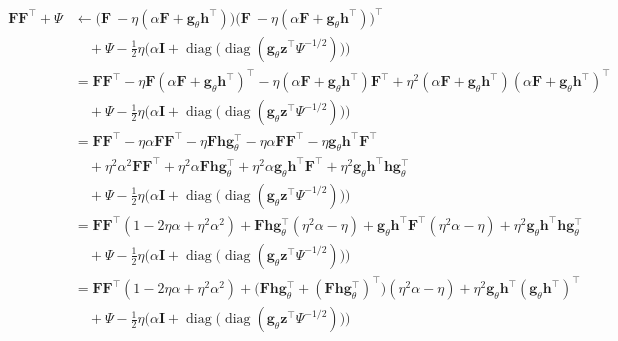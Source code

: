 \documentclass[msc,deptreport.inf]{infthesis} %
\newcommand{\matr}[1]{\mathbf{#1}}
\newcommand{\diag}{\mathop{\mathrm{diag}}}
\begin{document}
\begin{align}
\begin{split}
	\matr{F}\matr{F}^\intercal + \Psi
	& \leftarrow \big(\matr{F}\ - \eta (\alpha \matr{F} + \matr{g}_\theta \matr{h}^\intercal)\big) \big(\matr{F}\ - \eta (\alpha \matr{F} + \matr{g}_\theta \matr{h}^\intercal)\big)^\intercal \\
	& \quad + \Psi - \frac{1}{2} \eta \Big(\alpha \matr{I} + \diag\big(\diag(\matr{g}_\theta \matr{z}^\intercal \Psi^{-1/2})\big)\Big) \\
	& = \matr{F}\matr{F}^\intercal 
	- \eta \matr{F} (\alpha \matr{F} + \matr{g}_\theta \matr{h}^\intercal) ^\intercal
	- \eta (\alpha \matr{F} + \matr{g}_\theta \matr{h}^\intercal) \matr{F}^\intercal
	+ \eta^2 (\alpha \matr{F} + \matr{g}_\theta \matr{h}^\intercal) (\alpha \matr{F} + \matr{g}_\theta \matr{h}^\intercal)^\intercal \\
	& \quad + \Psi - \frac{1}{2} \eta \Big(\alpha \matr{I} + \diag\big(\diag(\matr{g}_\theta \matr{z}^\intercal \Psi^{-1/2})\big)\Big) \\
	& = \matr{F}\matr{F}^\intercal  
	- \eta \alpha \matr{F}\matr{F}^\intercal
	- \eta \matr{F} \matr{h} \matr{g}_\theta^\intercal
	- \eta \alpha \matr{F}\matr{F}^\intercal 
	- \eta \matr{g}_\theta \matr{h}^\intercal \matr{F}^\intercal \\
	& \quad + \eta^2 \alpha^2 \matr{F}\matr{F}^\intercal  
	+ \eta^2 \alpha \matr{F} \matr{h} \matr{g}_\theta^\intercal
	+ \eta^2 \alpha \matr{g}_\theta \matr{h}^\intercal \matr{F}^\intercal
	+ \eta^2 \matr{g}_\theta \matr{h}^\intercal \matr{h} \matr{g}_\theta^\intercal \\
	& \quad + \Psi - \frac{1}{2} \eta \Big(\alpha \matr{I} + \diag\big(\diag(\matr{g}_\theta \matr{z}^\intercal \Psi^{-1/2})\big)\Big) \\
	& = \matr{F}\matr{F}^\intercal (1 - 2\eta \alpha + \eta^2 \alpha^2) 
	+ \matr{F} \matr{h} \matr{g}_\theta^\intercal(\eta^2 \alpha - \eta)
	+ \matr{g}_\theta \matr{h}^\intercal \matr{F}^\intercal(\eta^2 \alpha - \eta) 
	+ \eta^2 \matr{g}_\theta \matr{h}^\intercal \matr{h} \matr{g}_\theta^\intercal \\
	& \quad + \Psi - \frac{1}{2} \eta \Big(\alpha \matr{I} + \diag\big(\diag(\matr{g}_\theta \matr{z}^\intercal \Psi^{-1/2})\big)\Big) \\
	& = \matr{F}\matr{F}^\intercal (1 - 2\eta \alpha + \eta^2 \alpha^2) 
	+ \big(\matr{F} \matr{h} \matr{g}_\theta^\intercal  + (\matr{F} \matr{h} \matr{g}_\theta^\intercal)^\intercal \big)(\eta^2 \alpha - \eta)
	+ \eta^2 \matr{g}_\theta \matr{h}^\intercal (\matr{g}_\theta \matr{h}^\intercal)^\intercal \\
	& \quad + \Psi - \frac{1}{2} \eta \Big(\alpha \matr{I} + \diag\big(\diag(\matr{g}_\theta \matr{z}^\intercal \Psi^{-1/2})\big)\Big) \\
\end{split}
\end{align}
\end{document}
